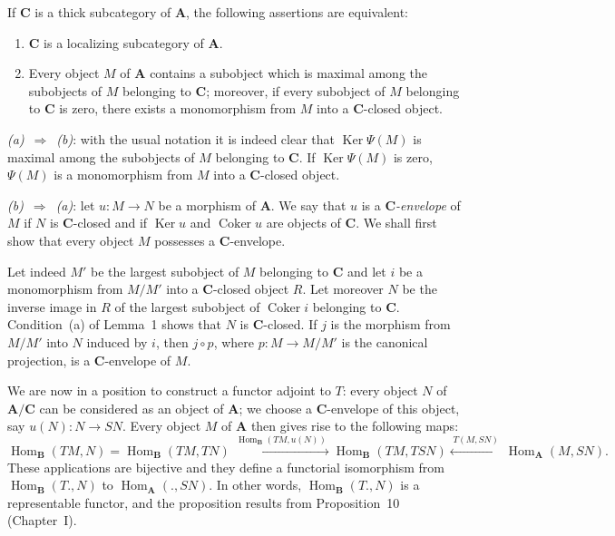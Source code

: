 \begin{proposition}
If $\mathbf C$ is a thick subcategory of $\mathbf A$, the following
assertions are equivalent:
\begin{enumerate}
\item[a.] $\mathbf C$ is a localizing subcategory of $\mathbf A$.
\item[b.] Every object $M$ of $\mathbf A$ contains a subobject which is
      maximal among the subobjects of $M$ belonging to $\mathbf C$;
      moreover, if every subobject of $M$ belonging to $\mathbf C$ is
      zero, there exists a monomorphism from $M$ into a
      $\mathbf C$-closed object.
\end{enumerate}
\end{proposition}

\emph{(a)}~$\Rightarrow$~\emph{(b)}: with the usual notation it is indeed
clear that $\operatorname{Ker}\Psi(M)$ is maximal among the subobjects
of $M$ belonging to $\mathbf C$. If $\operatorname{Ker}\Psi(M)$ is zero,
$\Psi(M)$ is a monomorphism from $M$ into a $\mathbf C$-closed object.

\emph{(b)}~$\Rightarrow$~\emph{(a)}: let $u\colon M\to N$ be a morphism
of $\mathbf A$. We say that $u$ is a \emph{$\mathbf C$-envelope} of $M$
if $N$ is $\mathbf C$-closed and if $\operatorname{Ker}u$ and
$\operatorname{Coker}u$ are objects of $\mathbf C$. We shall first show
that every object $M$ possesses a $\mathbf C$-envelope.

Let indeed $M'$ be the largest subobject of $M$ belonging to
$\mathbf C$ and let $i$ be a monomorphism from $M/M'$ into a
$\mathbf C$-closed object $R$. Let moreover $N$ be the inverse image in
$R$ of the largest subobject of $\operatorname{Coker}i$ belonging to
$\mathbf C$. Condition~(a) of Lemma~1 shows that $N$ is
$\mathbf C$-closed. If $j$ is the morphism from $M/M'$ into $N$ induced
by $i$, then $j\circ p$, where $p\colon M\to M/M'$ is the canonical
projection, is a $\mathbf C$-envelope of $M$.

We are now in a position to construct a functor adjoint to $T$: every
object $N$ of $\mathbf A/\mathbf C$ can be considered as an object of
$\mathbf A$; we choose a $\mathbf C$-envelope of this object, say
$u(N)\colon N\to SN$. Every object $M$ of $\mathbf A$ then gives rise to
the following maps:
\[
  \operatorname{Hom}_{\mathbf B}(TM,N)
  =\operatorname{Hom}_{\mathbf B}(TM,TN)
  \xrightarrow{\;\operatorname{Hom}_{\mathbf B}(TM,u(N))\;}
  \operatorname{Hom}_{\mathbf B}(TM,TSN)
  \xleftarrow{\;T(M,SN)\;}
  \operatorname{Hom}_{\mathbf A}(M,SN).
\]
These applications are bijective and they define a functorial isomorphism
from $\operatorname{Hom}_{\mathbf B}(T.,N)$ to
$\operatorname{Hom}_{\mathbf A}(.,SN)$. In other words,
$\operatorname{Hom}_{\mathbf B}(T.,N)$ is a representable functor, and
the proposition results from Proposition~10 (Chapter~I).

